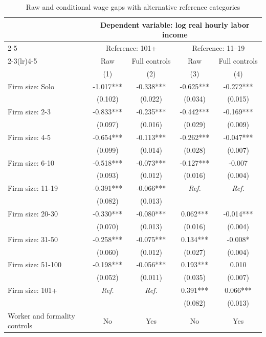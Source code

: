 \begin{table}[htbp]
  \centering
  \caption{Raw and conditional wage gaps with alternative reference categories}
  \label{tab:firm-size-alternative-reference-summary}
  \small
  \begin{tabular}{lcccc}
    \toprule
    & \multicolumn{4}{c}{Dependent variable: log real hourly labor income} \\
    \cmidrule(lr){2-5}
    & \multicolumn{2}{c}{Reference: 101+} & \multicolumn{2}{c}{Reference: 11--19} \\
    \cmidrule(lr){2-3}\cmidrule(lr){4-5}
    & Raw & Full controls & Raw & Full controls \\
    & (1) & (2) & (3) & (4) \\
    \midrule
    Firm size: Solo & -1.017*** & -0.338*** & -0.625*** & -0.272*** \\
     & (0.102) & (0.022) & (0.034) & (0.015) \\
    Firm size: 2-3 & -0.833*** & -0.235*** & -0.442*** & -0.169*** \\
     & (0.097) & (0.016) & (0.029) & (0.009) \\
    Firm size: 4-5 & -0.654*** & -0.113*** & -0.262*** & -0.047*** \\
     & (0.099) & (0.014) & (0.028) & (0.007) \\
    Firm size: 6-10 & -0.518*** & -0.073*** & -0.127*** & -0.007 \\
     & (0.093) & (0.012) & (0.016) & (0.004) \\
    Firm size: 11-19 & -0.391*** & -0.066*** & \textit{Ref.} & \textit{Ref.} \\
     & (0.082) & (0.013) & & \\
    Firm size: 20-30 & -0.330*** & -0.080*** & 0.062*** & -0.014*** \\
     & (0.070) & (0.013) & (0.016) & (0.004) \\
    Firm size: 31-50 & -0.258*** & -0.075*** & 0.134*** & -0.008* \\
     & (0.060) & (0.012) & (0.027) & (0.004) \\
    Firm size: 51-100 & -0.198*** & -0.056*** & 0.193*** & 0.010 \\
     & (0.052) & (0.011) & (0.035) & (0.007) \\
    Firm size: 101+ & \textit{Ref.} & \textit{Ref.} & 0.391*** & 0.066*** \\
     & & & (0.082) & (0.013) \\
    \midrule
    Worker and formality controls & No & Yes & No & Yes \\

\end{tabular}
\end{table}
